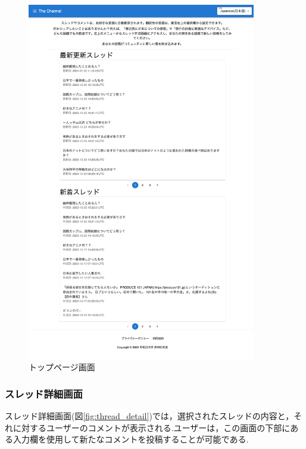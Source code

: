 \documentclass[b5paper,12pt,dvipdfmx]{jsreport}
\begin{document}
\begin{figure}[H]
	\centering
    \includegraphics[width=100mm,height=157.04mm]{./img/screen/top_page.png}
	\caption{トップページ画面}
	\label{fig:top_page}
\end{figure}

\subsubsection{スレッド詳細画面}
スレッド詳細画面(図\ref{fig:thread_detail})では，選択されたスレッドの内容と，それに対するユーザーのコメントが表示される.ユーザーは，この画面の下部にある入力欄を使用して新たなコメントを投稿することが可能である.
\end{document}
